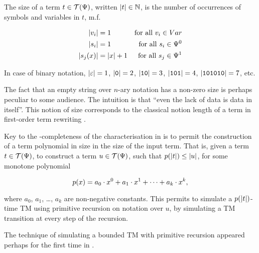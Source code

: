 \begin{definition} \label{def:single-sort-word-term-size} The size of a term $t
\in \mathcal{T}{\mathopen{}\left({\Psi}\right)\mathclose{}}$, written ${\mathopen{}\left|{t}\right|\mathclose{}} \in \mathbb{N}$, is the number of
occurrences of symbols and variables in $t$, m.f.

\begin{align*}
{\ensuremath{\mathopen{}\left|{v_i}\right|\mathclose{}}} &= 1 & \text{for all $v_i \in Var$} \\
{\mathopen{}\left|{s_i}\right|\mathclose{}} &= 1 & \text{for all $s_i\in \Psi^0$} \\
{\mathopen{}\left|{s_j{\mathopen{}\left({x}\right)\mathclose{}}}\right|\mathclose{}} &= {\mathopen{}\left|{x}\right|\mathclose{}} + 1 & \text{for all $s_j \in \Psi^1$}
\end{align*}

\end{definition}

\begin{example} In case of binary notation, ${\mathopen{}\left|{\varepsilon}\right|\mathclose{}}=1$,
${\mathopen{}\left|{\mathtt{0}}\right|\mathclose{}} = 2$, ${\mathopen{}\left|{\mathtt{1}\mathtt{0}}\right|\mathclose{}} = 3$,
${\mathopen{}\left|{\mathtt{1}\mathtt{0}\mathtt{1}}\right|\mathclose{}} = 4$,
${\mathopen{}\left|{\mathtt{1}\mathtt{0}\mathtt{1}\mathtt{0}\mathtt{1}\mathtt{0}}\right|\mathclose{}} = 7$, etc.
\end{example}

\begin{remark} The fact that an empty string over $n$-ary notation has a
non-zero size is perhaps peculiar to some audience. The intuition is that
``even the lack of data is data in itself''. This notion of size corresponds to
the classical notion length of a term in first-order term rewriting
\cite{klop-vrijer-2003}. \end{remark}

Key to the \FPTIME{}-completeness of the characterisation in \cite{cobham-1965}
is to permit the construction of a term polynomial in size in the size of the
input term.  That is, given a term $t \in \mathcal{T}{\mathopen{}\left({\Psi}\right)\mathclose{}}$, to construct a
term $u \in \mathcal{T}{\mathopen{}\left({\Psi}\right)\mathclose{}}$, such that $p{\mathopen{}\left({{\mathopen{}\left|{t}\right|\mathclose{}}}\right)\mathclose{}} \leq {\ensuremath{\mathopen{}\left|{u}\right|\mathclose{}}}$, for
some monotone polynomial

$$p{\mathopen{}\left({x}\right)\mathclose{}}=a_0 \cdot x^0 + a_1 \cdot x^1 + \cdots + a_k \cdot x^k,$$

where $a_0$, $a_1$, \ldots, $a_k$ are non-negative constants. This permits to
simulate a $p{\mathopen{}\left({{\mathopen{}\left|{t}\right|\mathclose{}}}\right)\mathclose{}}$-time TM using primitive recursion on notation over
$u$, by simulating a TM transition at every step of the recursion.

\begin{remark} The technique of simulating a bounded TM with primitive
recursion appeared perhaps for the first time in \cite[.1/176]{minsky-1967}.  \end{remark}

